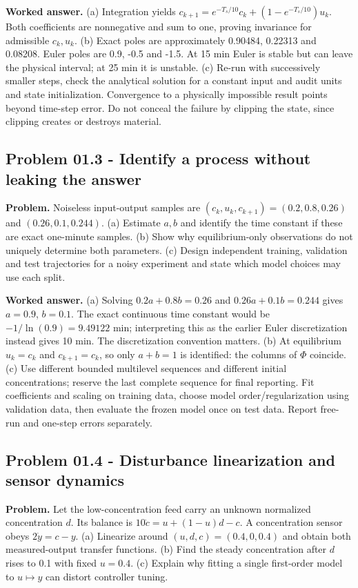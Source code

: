 \documentclass[11pt,a4paper]{article}
\begin{document}
\textbf{Worked answer.} (a) Integration yields $c_{k+1}=e^{-T_s/10}c_k+(1-e^{-T_s/10})u_k$. Both coefficients are nonnegative and sum to one, proving invariance for admissible $c_k,u_k$. (b) Exact poles are approximately 0.90484, 0.22313 and 0.08208. Euler poles are 0.9, -0.5 and -1.5. At 15 min Euler is stable but can leave the physical interval; at 25 min it is unstable. (c) Re-run with successively smaller steps, check the analytical solution for a constant input and audit units and state initialization. Convergence to a physically impossible result points beyond time-step error. Do not conceal the failure by clipping the state, since clipping creates or destroys material.

\subsection{Problem 01.3 - Identify a process without leaking the answer}
\textbf{Problem.} Noiseless input-output samples are $(c_k,u_k,c_{k+1})=(0.2,0.8,0.26)$ and $(0.26,0.1,0.244)$. (a) Estimate $a,b$ and identify the time constant if these are exact one-minute samples. (b) Show why equilibrium-only observations do not uniquely determine both parameters. (c) Design independent training, validation and test trajectories for a noisy experiment and state which model choices may use each split.


\textbf{Worked answer.} (a) Solving $0.2a+0.8b=0.26$ and $0.26a+0.1b=0.244$ gives $a=0.9$, $b=0.1$. The exact continuous time constant would be $-1/\ln(0.9)=9.49122$ min; interpreting this as the earlier Euler discretization instead gives 10 min. The discretization convention matters. (b) At equilibrium $u_k=c_k$ and $c_{k+1}=c_k$, so only $a+b=1$ is identified: the columns of $\Phi$ coincide. (c) Use different bounded multilevel sequences and different initial concentrations; reserve the last complete sequence for final reporting. Fit coefficients and scaling on training data, choose model order/regularization using validation data, then evaluate the frozen model once on test data. Report free-run and one-step errors separately.

\subsection{Problem 01.4 - Disturbance linearization and sensor dynamics}
\textbf{Problem.} Let the low-concentration feed carry an unknown normalized concentration $d$. Its balance is $10\dot c=u+(1-u)d-c$. A concentration sensor obeys $2\dot y=c-y$. (a) Linearize around $(u,d,c)=(0.4,0,0.4)$ and obtain both measured-output transfer functions. (b) Find the steady concentration after $d$ rises to 0.1 with fixed $u=0.4$. (c) Explain why fitting a single first-order model to $u\mapsto y$ can distort controller tuning.
\end{document}
